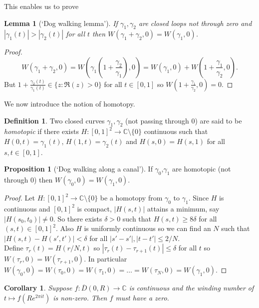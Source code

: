 \documentclass[a4paper, 10pt, twocolumn]{amsart}
\newtheorem*{corollary}{Corollary}
\newtheorem*{lemma}{Lemma}
\theoremstyle{definition}
\newtheorem*{definition}{Definition}
\newtheorem*{proposition}{Proposition}
\newcommand{\bb}[1]{\mathbb{#1}}
\newcommand{\1}{\mathbbm{1}}
\begin{document}
This enables us to prove

\begin{lemma}[`Dog walking lemma']
    If $\gamma_1,\gamma_2$ are closed loops not through zero and $|\gamma_1(t)|>|\gamma_2(t)|$ for all $t$ then $W(\gamma_1+\gamma_2,0) = W(\gamma_1,0)$. 
\end{lemma}

\begin{proof}
    \[W(\gamma_1+\gamma_2,0) = W(\gamma_1(1+\frac{\gamma_2}{\gamma_1}),0) = W(\gamma_1,0) + W(1+\frac{\gamma_1}{\gamma_2},0).\]
    But $1+\frac{\gamma_2(t)}{\gamma_1(t)} \in \{z : \Re(z) > 0\}$ for all $t \in [0,1]$ so $W(1+\frac{\gamma_1}{\gamma_2},0)=0$.
\end{proof}

We now introduce the notion of homotopy. 
\begin{definition}
    Two closed curves $\gamma_1,\gamma_2$ (not passing through $0$) are said to be \textit{homotopic} if there exists $H:[0,1]^2 \to \bb{C} \setminus \{0\}$ continuous such that $H(0,t) = \gamma_1(t)$, $H(1,t) = \gamma_2(t)$ and $H(s,0) = H(s,1)$ for all $s,t \in [0,1]$. 
\end{definition}


\begin{proposition}[`Dog walking along a canal']
    If $\gamma_0$,$\gamma_1$ are homotopic (not through $0$) then $W(\gamma_0,0) = W(\gamma_1,0)$. 
\end{proposition}

\begin{proof}
    Let $H:[0,1]^2 \to \bb{C} \setminus \{0\}$ be a homotopy from $\gamma_0$ to $\gamma_1$. Since $H$ is continuous and $[0,1]^2$ is compact, $|H(s,t)|$ attains a minimum, say $|H(s_0,t_0)| \ne 0$. So there exists $\delta>0$ such that $H(s,t) \ge 8\delta$ for all $(s,t) \in [0,1]^2$. Also $H$ is uniformly continuous so we can find an $N$ such that $|H(s,t)-H(s',t')|<\delta$ for all $|s'-s'|,|t-t'| \le 2/N$. \\

    Define $\tau_r(t) = H(r/N,t)$ so $|\tau_r(t)-\tau_{r+1}(t)| \le \delta$ for all $t$ so $W(\tau_r,0) = W(\tau_{r+1},0)$. In particular $W(\gamma_0,0) = W(\tau_0,0) = W(\tau_{1},0) = \ldots = W(\tau_N,0) = W(\gamma_1,0)$.
\end{proof}

\begin{corollary}
    Suppose $f: \overline{D}(0,R) \to \bb{C}$ is continuous and the winding number of $t\mapsto f(Re^{2\pi it})$ is non-zero. Then $f$ must have a zero.
\end{corollary}
\end{document}
